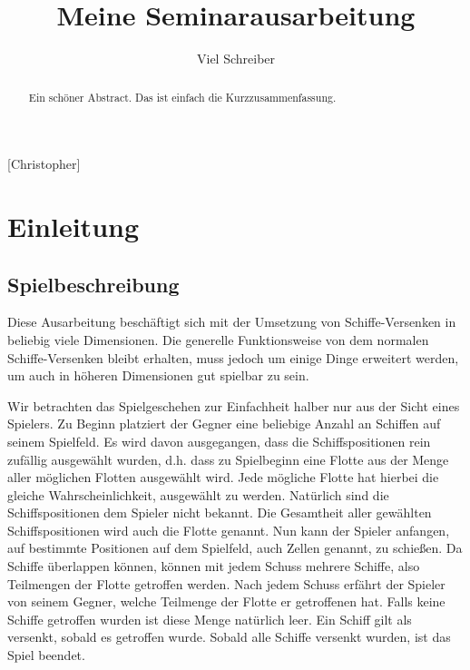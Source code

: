 \documentclass[a4paper,12pt]{llncs}
\numberwithin{equation}{section}
\begin{document}

\author{Viel Schreiber}

\title{Meine Seminarausarbeitung}

\maketitle

\thispagestyle{empty}

\begin{abstract}
Ein schöner Abstract. Das ist einfach die Kurzzusammenfassung.
\end{abstract}

[Christopher]

\section{Einleitung}

\subsection{Spielbeschreibung}
Diese Ausarbeitung beschäftigt sich mit der Umsetzung von Schiffe-Versenken in beliebig viele Dimensionen.
Die generelle Funktionsweise von dem normalen Schiffe-Versenken bleibt erhalten, muss jedoch um einige Dinge erweitert werden, um auch in höheren Dimensionen gut spielbar zu sein.

Wir betrachten das Spielgeschehen zur Einfachheit halber nur aus der Sicht eines Spielers.
Zu Beginn platziert der Gegner eine beliebige Anzahl an Schiffen auf seinem Spielfeld. Es wird davon ausgegangen, dass die Schiffspositionen rein zufällig ausgewählt wurden, d.h. dass zu Spielbeginn eine Flotte aus der Menge aller möglichen Flotten ausgewählt wird. Jede mögliche Flotte hat hierbei die gleiche Wahrscheinlichkeit, ausgewählt zu werden.
Natürlich sind die Schiffspositionen dem Spieler nicht bekannt.
Die Gesamtheit aller gewählten Schiffspositionen wird auch die Flotte genannt.
Nun kann der Spieler anfangen, auf bestimmte Positionen auf dem Spielfeld, auch Zellen genannt, zu schießen.
Da Schiffe überlappen können, können mit jedem Schuss mehrere Schiffe, also Teilmengen der Flotte getroffen werden.
Nach jedem Schuss erfährt der Spieler von seinem Gegner, welche Teilmenge der Flotte er getroffenen hat.
Falls keine Schiffe getroffen wurden ist diese Menge natürlich leer.
Ein Schiff gilt als versenkt, sobald es getroffen wurde.
Sobald alle Schiffe versenkt wurden, ist das Spiel beendet.
\end{document}
